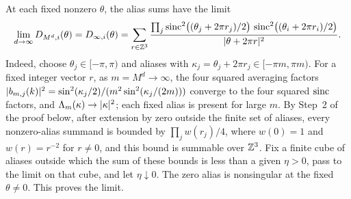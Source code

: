 \begin{remark}\label{ch05:rem:infinite-depth}
At each fixed nonzero $\theta$, the alias sums have the limit
\[
 \lim_{d\to\infty}D_{M^d,i}(\theta)=D_{\infty,i}(\theta)=\sum_{r\in\mathbb Z^3}\frac{\prod_j\operatorname{sinc}^2\bigl((\theta_j+2\pi r_j)/2\bigr)\,\operatorname{sinc}^2\bigl((\theta_i+2\pi r_i)/2\bigr)}{\lvert \theta+2\pi r\rvert^2}.
\]
Indeed, choose $\theta_j\in[-\pi,\pi)$ and aliases with $\kappa_j=\theta_j+2\pi r_j\in[-\pi m,\pi m)$. For a fixed integer vector $r$, as $m=M^d\to\infty$, the four squared averaging factors $\lvert b_{m,j}(k)\rvert^2=\sin^2(\kappa_j/2)/(m^2\sin^2(\kappa_j/(2m)))$ converge to the four squared $\operatorname{sinc}$ factors, and $\Lambda_m(\kappa)\to\lvert \kappa\rvert^2$; each fixed alias is present for large $m$. By Step~2 of the proof below, after extension by zero outside the finite set of aliases, every nonzero-alias summand is bounded by $\prod_jw(r_j)/4$, where $w(0)=1$ and $w(r)=r^{-2}$ for $r\ne0$, and this bound is summable over $\mathbb Z^3$. Fix a finite cube of aliases outside which the sum of these bounds is less than a given $\eta>0$, pass to the limit on that cube, and let $\eta\downarrow0$. The zero alias is nonsingular at the fixed $\theta\ne0$. This proves the limit.
\end{remark}

